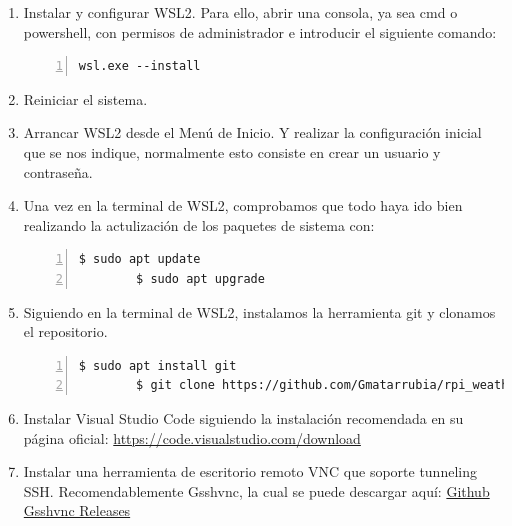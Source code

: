 \begin{enumerate}
    \item Instalar y configurar \gls{WSL2}. Para ello, abrir una consola, ya sea cmd
    o powershell, con permisos de administrador e introducir el siguiente comando:
    \begin{lstlisting}[style=cmd, numbers=left]
        wsl.exe --install
    \end{lstlisting}

    \item Reiniciar el sistema.

    \item Arrancar \gls{WSL2} desde el Menú de Inicio. Y realizar la configuración
    inicial que se nos indique, normalmente esto consiste en crear un usuario y
    contraseña.

    \item Una vez en la terminal de \gls{WSL2}, comprobamos que todo haya ido bien realizando
    la actulización de los paquetes de sistema con:
    \begin{lstlisting}[style=consola, numbers=left]
        $ sudo apt update
        $ sudo apt upgrade
    \end{lstlisting}

    \item Siguiendo en la terminal de \gls{WSL2}, instalamos la herramienta git y clonamos
    el repositorio.
    \begin{lstlisting}[style=consola, numbers=left]
        $ sudo apt install git
        $ git clone https://github.com/Gmatarrubia/rpi_weather.git
    \end{lstlisting}

    \item Instalar Visual Studio Code siguiendo la instalación recomendada en su página
    oficial: \href{https://code.visualstudio.com/download}{https://code.visualstudio.com/download}

    \item Instalar una herramienta de escritorio remoto VNC que soporte tunneling SSH.
    Recomendablemente Gsshvnc, la cual se puede descargar aquí:
    \href{https://github.com/zrax/gsshvnc/releases}{Github Gsshvnc Releases}


\end{enumerate}
